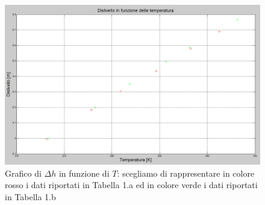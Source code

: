 \begin{figure}[H]
\centering
\includegraphics[width=\textwidth]{img/1}
\caption{Grafico di $\Delta h$ in funzione di $T$: scegliamo di rappresentare in colore rosso i dati riportati in Tabella 1.a ed in colore verde i dati riportati in Tabella 1.b}
\end{figure}

